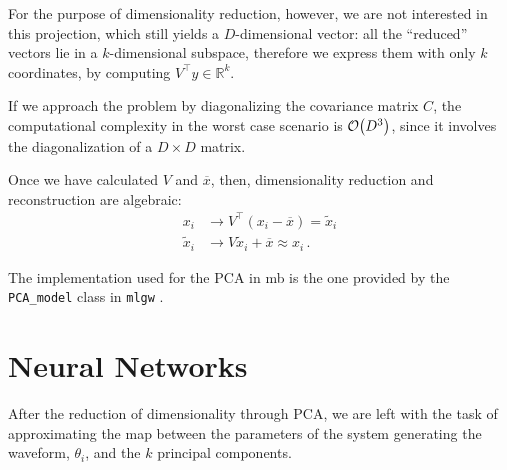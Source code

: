 \documentclass[main.tex]{subfiles}
\begin{document}
For the purpose of dimensionality reduction, however, we are not interested in this projection, which still yields a \(D\)-dimensional vector: all the ``reduced'' vectors lie in a \(k\)-dimensional subspace, therefore we express them with only \(k\) coordinates, by computing \(V^{\top} y \in \mathbb{R}^{k}\). 


If we approach the problem by diagonalizing the covariance matrix \(C\), the computational complexity in the worst case scenario is \(\order{D^3}\), since it involves the diagonalization of a \(D \times D\) matrix.

Once we have calculated \(V\) and \(\overline{x}\), then, dimensionality reduction and reconstruction are algebraic: 
%
\begin{subequations}
\begin{align}
x_i &\to V^{\top}(x_i - \overline{x}) = \widetilde{x}_i  \\
\widetilde{x}_i &\to V \widetilde{x}_i + \overline{x} \approx x_i
\,.
\end{align}
\end{subequations}

The implementation used for the \ac{PCA} in \ac{mb} is the one provided by the \texttt{PCA\_model} class in \texttt{mlgw} \cite[]{schmidtMachineLearningGravitational2020}. 





\section{Neural Networks} \label{sec:neural-network}

After the reduction of dimensionality through \ac{PCA}, we are left with the task of approximating the map between the parameters of the system generating the waveform, \(\theta _i\), and the \(k\) principal components. 
\end{document}
